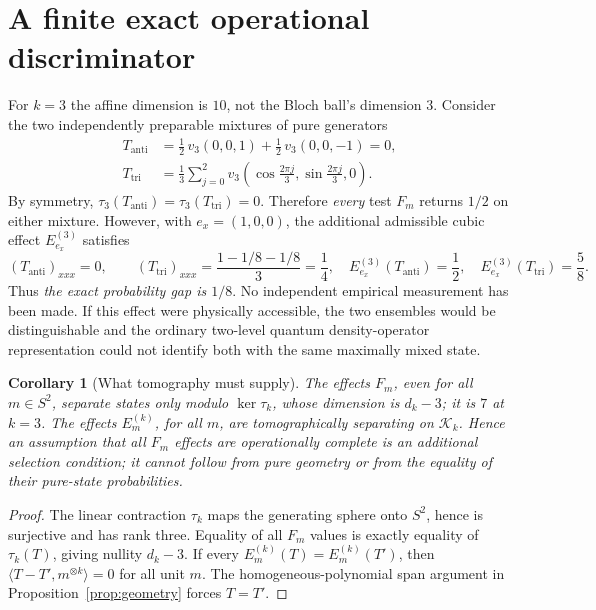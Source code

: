 \documentclass[10.5pt,letterpaper]{article}
\newtheorem{corollary}[theorem]{Corollary}
\newcommand{\KK}{\mathcal{K}}
\begin{document}
\section{A finite exact operational discriminator}
For $k=3$ the affine dimension is $10$, not the Bloch ball's dimension $3$. Consider the two independently preparable mixtures of pure generators
\begin{align}\label{eq:two}
T_{\mathrm{anti}}&=\tfrac12\,v_3(0,0,1)+\tfrac12\,v_3(0,0,-1)=0,\\
T_{\mathrm{tri}}&=\tfrac13\sum_{j=0}^{2}v_3\!\left(\cos\frac{2\pi j}{3},\sin\frac{2\pi j}{3},0\right).
\end{align}
By symmetry, $\tau_3(T_{\mathrm{anti}})=\tau_3(T_{\mathrm{tri}})=0$. Therefore \emph{every} test $F_m$ returns $1/2$ on either mixture. However, with $e_x=(1,0,0)$, the additional admissible cubic effect $E_{e_x}^{(3)}$ satisfies
\begin{equation}\label{eq:gap}
(T_{\mathrm{anti}})_{xxx}=0,\qquad
(T_{\mathrm{tri}})_{xxx}=\frac{1-1/8-1/8}{3}=\frac14,
\quad E_{e_x}^{(3)}(T_{\mathrm{anti}})=\frac12,\quad
E_{e_x}^{(3)}(T_{\mathrm{tri}})=\frac58.
\end{equation}
Thus \emph{the exact probability gap is $1/8$}. No independent empirical measurement has been made. If this effect were physically accessible, the two ensembles would be distinguishable and the ordinary two-level quantum density-operator representation could not identify both with the same maximally mixed state.

\begin{corollary}[What tomography must supply]\label{cor:tomo}
The effects $F_m$, even for all $m\in S^2$, separate states only modulo $\ker\tau_k$, whose dimension is $d_k-3$; it is $7$ at $k=3$. The effects $E_m^{(k)}$, for all $m$, \emph{are} tomographically separating on $\KK_k$. Hence an assumption that all $F_m$ effects are operationally complete is an additional selection condition; it cannot follow from pure geometry or from the equality of their pure-state probabilities.
\end{corollary}
\begin{proof}
The linear contraction $\tau_k$ maps the generating sphere onto $S^2$, hence is surjective and has rank three. Equality of all $F_m$ values is exactly equality of $\tau_k(T)$, giving nullity $d_k-3$. If every $E_m^{(k)}(T)=E_m^{(k)}(T')$, then $\langle T-T',m^{\otimes k}\rangle=0$ for all unit $m$. The homogeneous-polynomial span argument in Proposition~\ref{prop:geometry} forces $T=T'$.
\end{proof}
\end{document}
